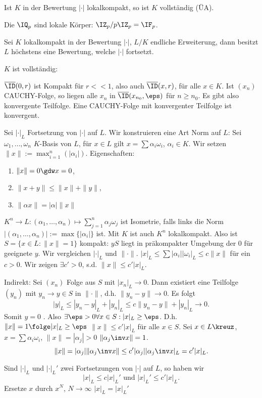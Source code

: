 \begin{Bemerkung}
 Ist $K$ in der Bewertung $|\cdot|$ lokalkompakt, so ist $K$ vollständig (ÜA).
\end{Bemerkung}

\begin{Beispiel}
 Die $\IQ_p$ sind lokale Körper: $\IZ_p/p\IZ_p=\IF_p$.
\end{Beispiel}

\begin{Fakt}
 Sei $K$ lokalkompakt in der Bewertung $|\cdot|$, $L/K$ endliche Erweiterung, dann besitzt $L$ höchstens eine Bewertung, welche $|\cdot|$ fortsetzt.
\end{Fakt}

\begin{Beweis}
 $K$ ist vollständig:
 
 $\overline\ID(0,r)$ ist Kompakt für $r<<1$, also auch $\overline\ID(x,r)$, für alle $x\in K$. Ist $(x_n)$ CAUCHY-Folge, so liegen alle $x_n$ in $\overline{\ID}(x_{n_0},\eps)$ für $n\geq n_0$. Es gibt also konvergente Teilfolge. Eine CAUCHY-Folge mit konvergenter Teilfolge ist konvergent.
 
 Sei $|\cdot|_L$ Fortsetzung von $|\cdot|$ auf $L$. Wir konstruieren eine Art Norm auf $L$:
 Sei $\omega_1,\ldots,\omega_n$ $K$-Basis von $L$, für $x\in L$ gilt $x=\sum \alpha_i\omega_i$, $\alpha_i\in K$. Wir setzen $\|x\|:=\max_{i=1}^n(|\alpha_i|)$.
 Eigenschaften:
 \begin{enumerate}
  \item $\|x\|=0 \gdw x=0$,
  \item $\|x+y\|\leq \|x\|+\|y\|$,
  \item $\|\alpha x\|=|\alpha|\|x\|$
 \end{enumerate}
 $K^n\rightarrow L: (\alpha_1,\ldots,\alpha_n)\mapsto \sum_{j=1}^n\alpha_j\omega_j$ ist Isometrie, falls links die Norm $|(\alpha_1,\ldots,\alpha_n)|:=\max\{|\alpha_i|\}$ ist. Mit $K$ ist auch $K^n$ lokalkompakt. Also ist $S=\{ x\in L : \|x\|=1\}$ kompakt: $yS$ liegt in präkompakter Umgebung der $0$ für geeignete $y$. Wir vergleichen $|\cdot|_L$ und $\|\cdot\|$. $|x|_L\leq\sum|\alpha_i||\omega_i|_L\leq c\|x\|$ für ein $c>0$. Wir zeigen $\exists c'>0$, s.d. $\|x\|\leq c' |x|_L$.

 Indirekt: Sei $(x_n)$ Folge aus $S$ mit $|x_n|_L\rightarrow 0$. Dann existiert eine Teilfolge $(y_n)$ mit $y_n\rightarrow y\in S$ in $\|\cdot\|$, d.h. $\| y_n-y\|\rightarrow 0$. Es folgt 
 \[ |y|_L\leq |y_n-y|_L+|y_n|_L\leq c\| y_n-y\|+|y_n|_L\rightarrow 0.\]
 Somit $y=0$ \lightning. Also $\exists \eps>0 \forall x\in S: |x|_L\geq \eps$. D.h. $\|x\|=1 \folge |x|_L\geq \eps$ \folge $\|x\| \leq c' |x|_L$ für alle $x\in S$.
 Sei $x\in L\kreuz$, $x=\sum \alpha_i\omega_i$, $\|x\|=|\alpha_j|>0$ \folge $\|\alpha_j\inv x\|=1$.
 \[ \|x\|=|\alpha_j|\|\alpha_j\inv x\|\leq c'|\alpha_j| |\alpha_j\inv x|_L=c'|x|_L.\]
 
 Sind $|\cdot|_L$ und $|\cdot|_L'$ zwei Fortsetzungen von $|\cdot|$ auf $L$, so haben wir
 \[ |x|_L\leq c|x|_L' \text{ und } |x|_L'\leq c'|x|_L.\]
 Ersetze $x$ durch $x^N$, $N\rightarrow\infty$ \folge $|x|_L=|x|_L'$
\end{Beweis}
